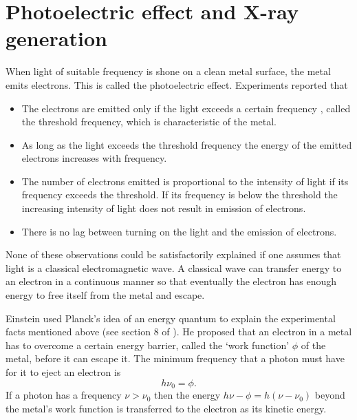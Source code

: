 \section{Photoelectric effect and X-ray generation}\label{c2s2}
When light of suitable frequency is shone on a clean metal surface, the metal
emits electrons. This is called the photoelectric effect. Experiments reported
that
\begin{itemize}
\item The electrons are emitted only if the light exceeds a certain frequency
, called the threshold frequency, which is characteristic of the metal.
\item As long as the light exceeds the threshold frequency the energy of the 
emitted electrons increases with frequency.
\item The number of electrons emitted is proportional to the intensity of light
if its frequency exceeds the threshold. If its frequency is below the threshold
the increasing intensity of light does not result in emission of electrons.
\item There is no lag between turning on the light and the emission of electrons.
\end{itemize}

None of these observations could be satisfactorily explained if one assumes that
light is a classical electromagnetic wave. A classical wave can transfer energy
to an electron in a continuous manner so that eventually the electron has enough
energy to free itself from the metal and escape.

Einstein used Planck's idea of an energy quantum to explain the experimental 
facts mentioned above (see section 8 of \cite{einstein1905heuristic}). He 
proposed that an electron in a metal has to overcome a certain energy barrier,
called the `work function' $\phi$ of the metal, before it can escape it. The
minimum frequency that a photon must have for it to eject an electron is
\begin{equation}\label{c2s2e1}
h\nu_0 = \phi.
\end{equation}
If a photon has a frequency $\nu > \nu_0$ then the energy $h\nu - \phi =
h(\nu - \nu_0)$ beyond the metal's work function is transferred to the
electron as its kinetic energy.

